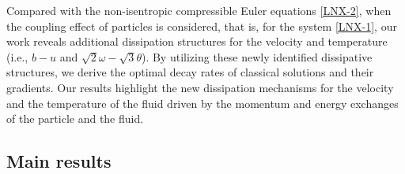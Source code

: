 \documentclass[reqno,11pt]{amsart}
\theoremstyle{plain}
\numberwithin{equation}{section}
\begin{document}
 Compared with the non-isentropic compressible Euler equations  \eqref{LNX-2}, when the 
 coupling effect of particles is considered, that is, for the system \eqref{LNX-1},
  our work reveals additional dissipation structures for the velocity and temperature 
  (i.e., $b - u$ and $\sqrt{2}\omega-\sqrt{3}\theta$). By utilizing these newly 
  identified dissipative structures, we derive the optimal decay rates of classical 
  solutions and their gradients.
Our results highlight 
the new dissipation mechanisms for the velocity and the temperature of the fluid driven by the  momentum and energy 
exchanges of the particle and the fluid. 


%

\subsection{Main results}
 
\end{document}
